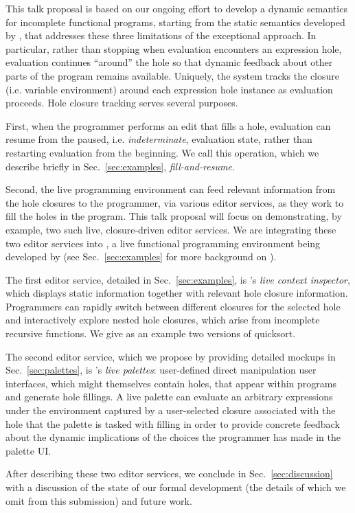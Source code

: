 This talk proposal is based on our ongoing effort to develop a dynamic semantics for incomplete functional programs, starting from the static semantics developed by \citet{popl-paper},  that addresses these three limitations of the exceptional approach. 
In particular, rather than stopping when evaluation encounters an expression hole, evaluation continues ``around'' the hole so that dynamic feedback about other parts of the program remains available. 
Uniquely, the system tracks the closure (i.e. variable environment) around each expression hole instance as evaluation proceeds. Hole closure tracking serves several purposes. 

First, when the programmer performs an edit that fills a hole, evaluation can resume from the paused, i.e. \emph{indeterminate}, evaluation state, rather than restarting evaluation from the beginning. We call this operation, which we describe briefly in Sec.~\ref{sec:examples}, \emph{fill-and-resume}. 

Second, the live programming environment can feed relevant information from the {hole closures} to the programmer, via various editor services, as they work to fill the holes in the program. 
This talk proposal will focus on demonstrating, by example, two such live, closure-driven editor services. We are integrating these two editor services into \Hazel, a live functional programming environment being developed by \citet{HazelnutSNAPL} (see Sec.~\ref{sec:examples} for more background on \Hazel). 

The first editor service, detailed in Sec.~\ref{sec:examples}, is \Hazel's \emph{live context inspector}, which displays static information together with relevant hole closure information. 
Programmers can rapidly switch between different closures for the selected hole and interactively explore nested hole closures, which arise from incomplete recursive functions. We give as an example two versions of quicksort.

The second editor service, which we propose by providing detailed mockups in Sec.~\ref{sec:palettes}, is \Hazel's \emph{live palettes}: user-defined direct manipulation user interfaces, which might themselves contain holes, that appear within
\Hazel programs and generate hole fillings. 
A live palette can evaluate an arbitrary expressions under the environment captured by a user-selected closure associated with the hole that the palette is tasked with filling in order to provide concrete feedback
about the dynamic implications of the choices the programmer has made in the palette UI. 

After describing these two editor services, we conclude in Sec.~\ref{sec:discussion} with a discussion of the state of our formal development (the details of which we omit from this submission) and future work.